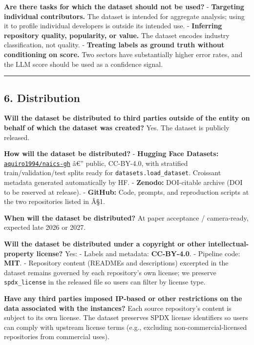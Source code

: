 \textbf{Are there tasks for which the dataset should not be used?}
- \textbf{Targeting individual contributors.} The dataset is intended for
aggregate analysis; using it to profile individual developers is
outside its intended use.
- \textbf{Inferring repository quality, popularity, or value.} The dataset
encodes industry classification, not quality.
- \textbf{Treating labels as ground truth without conditioning on score.}
Two sectors have substantially higher error rates, and the LLM
score should be used as a confidence signal.

\begin{center}\rule{0.5\linewidth}{0.5pt}\end{center}

\hypertarget{distribution}{%
\subsection{6. Distribution}\label{distribution}}

\textbf{Will the dataset be distributed to third parties outside of the
entity on behalf of which the dataset was created?}
Yes. The dataset is publicly released.

\textbf{How will the dataset be distributed?}
- \textbf{Hugging Face Datasets:}
\href{https://huggingface.co/datasets/aquiro1994/naics-gh}{\texttt{aquiro1994/naics-gh}}
â€'' public, CC-BY-4.0, with stratified train/validation/test splits
ready for \texttt{datasets.load\_dataset}. Croissant metadata generated
automatically by HF.
- \textbf{Zenodo:} DOI-citable archive (DOI to be reserved at release).
- \textbf{GitHub:} Code, prompts, and reproduction scripts at the two
repositories listed in Â§1.

\textbf{When will the dataset be distributed?}
At paper acceptance / camera-ready, expected late 2026 or 2027.

\textbf{Will the dataset be distributed under a copyright or other
intellectual-property license?}
Yes:
- Labels and metadata: \textbf{CC-BY-4.0}.
- Pipeline code: \textbf{MIT}.
- Repository content (READMEs and descriptions) excerpted in the
dataset remains governed by each repository's own license; we
preserve \texttt{spdx\_license} in the released file so users can filter
by license type.

\textbf{Have any third parties imposed IP-based or other restrictions on the
data associated with the instances?}
Each source repository's content is subject to its own license. The
dataset preserves SPDX license identifiers so users can comply with
upstream license terms (e.g., excluding non-commercial-licensed
repositories from commercial uses).

